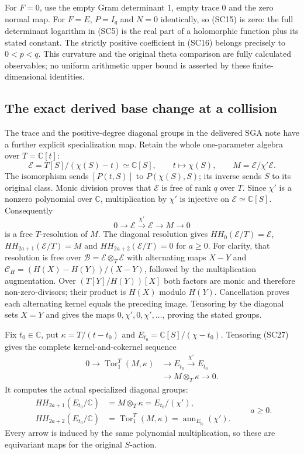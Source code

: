 For $F=0$, use the empty Gram determinant $1$, empty trace $0$
and the zero normal map.  For $F=E$, $P=I_q$ and $N=0$ identically,
so (SC15) is zero: the full determinant logarithm in (SC5) is the
real part of a holomorphic function plus its stated constant.
The strictly positive coefficient in (SC16) belongs precisely to
$0<p<q$.  This curvature and the original theta comparison are
fully calculated observables; no uniform arithmetic upper bound is
asserted by these finite-dimensional identities.

\subsection{The exact derived base change at a collision}

The trace and the positive-degree diagonal groups in the delivered
SGA note have a further explicit specialization map.  Retain the
whole one-parameter algebra over $T=\mathbb C[t]$:
\[
 \mathscr E=T[S]/(\chi(S)-t)\simeq\mathbb C[S],
 \qquad t\longmapsto\chi(S),\qquad
 M=\mathscr E/\chi'\mathscr E.
 \tag{SC26}
\]
The isomorphism sends $[P(t,S)]$ to $P(\chi(S),S)$; its inverse
sends $S$ to its original class.  Monic division proves that
$\mathscr E$ is free of rank $q$ over $T$.  Since $\chi'$ is a
nonzero polynomial over $\mathbb C$, multiplication by $\chi'$
is injective on $\mathscr E\simeq\mathbb C[S]$.  Consequently
\[
 0\longrightarrow\mathscr E\xrightarrow{\chi'}\mathscr E
   \longrightarrow M\longrightarrow0
 \tag{SC27}
\]
is a free $T$-resolution of $M$.  The diagonal resolution gives
$HH_0(\mathscr E/T)=\mathscr E$,
$HH_{2a+1}(\mathscr E/T)=M$ and
$HH_{2a+2}(\mathscr E/T)=0$ for $a\geq0$.
For clarity, that resolution is free over
$\mathscr B=\mathscr E\otimes_T\mathscr E$ with alternating maps
$X-Y$ and $\mathcal C_H=(H(X)-H(Y))/(X-Y)$, followed by
the multiplication augmentation.  Over
$(T[Y]/H(Y))[X]$ both factors are monic and therefore
non-zero-divisors; their product is $H(X)$ modulo $H(Y)$.
Cancellation proves each alternating kernel equals the preceding
image.  Tensoring by the diagonal sets $X=Y$ and gives the maps
$0,\chi',0,\chi',\ldots$, proving the stated groups.

Fix $t_0\in\mathbb C$, put $\kappa=T/(t-t_0)$ and
$E_{t_0}=\mathbb C[S]/(\chi-t_0)$.  Tensoring (SC27) gives the
complete kernel-and-cokernel sequence
\[
\begin{split}
0\longrightarrow\operatorname{Tor}_1^T(M,\kappa)
 &\longrightarrow E_{t_0}\xrightarrow{\chi'} E_{t_0}\\
 &\longrightarrow M\otimes_T\kappa\longrightarrow0.
\end{split}\tag{SC28}
\]
It computes the actual specialized diagonal groups:
\[
 \begin{split}
 HH_{2a+1}(E_{t_0}/\mathbb C)&=M\otimes_T\kappa
                              =E_{t_0}/(\chi'),\\
 HH_{2a+2}(E_{t_0}/\mathbb C)&=\operatorname{Tor}_1^T(M,\kappa)
                              =\operatorname{ann}_{E_{t_0}}(\chi').
 \end{split}\qquad a\geq0.
 \tag{SC29}
\]
Every arrow is induced by the same polynomial multiplication,
so these are equivariant maps for the original $S$-action.

